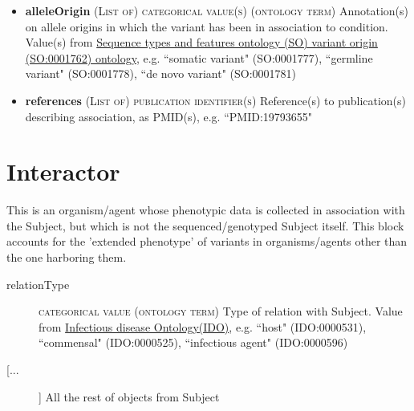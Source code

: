 \documentclass[a4paper, 10pt]{article}        %
\begin{document}
\begin{description}
\begin{itemize}
				\item[] \textbf{alleleOrigin} {\textsc{(List of) categorical value(s) (ontology term)}} Annotation(s) on allele origins in which the variant has been in association to condition. Value(s) from \href{http://purl.obolibrary.org/obo/SO_0001762}{Sequence types and features ontology (SO) variant origin (SO:0001762) ontology}, e.g. ``somatic variant" (SO:0001777), ``germline variant" (SO:0001778), ``de novo variant" (SO:0001781)
				\item[] \textbf{references} {\textsc{(List of) publication identifier(s)}} Reference(s) to publication(s) describing association, as PMID(s), e.g. ``PMID:19793655"
		 \end{itemize} 

 \end{description}
 


  
 \section*{{\color{teal} Interactor}}
This is an organism/agent whose phenotypic data is collected in association with the Subject, but which is not the sequenced/genotyped Subject itself. This block accounts for the 'extended phenotype' of variants in organisms/agents other than the one harboring them.
\begin{description}
	\item[relationType] {\textsc{categorical value (ontology term)}} Type of relation with Subject. Value from \href{https://www.ebi.ac.uk/ols/ontologies/ido}{Infectious disease Ontology(IDO)}, e.g. ``host" (IDO:0000531), ``commensal" (IDO:0000525), ``infectious agent" (IDO:0000596)
	
	\item[[...]] All the rest of objects from Subject
\end{description}
 
 
\end{document}
